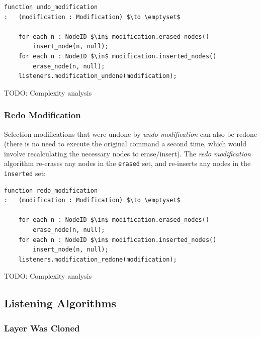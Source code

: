 \begin{lstlisting}[style=Default]
function undo_modification
:	(modification : Modification) $\to \emptyset$

	for each n : NodeID $\in$ modification.erased_nodes()
		insert_node(n, null);
	for each n : NodeID $\in$ modification.inserted_nodes()
		erase_node(n, null);
	listeners.modification_undone(modification);
\end{lstlisting}

\noindent TODO: Complexity analysis

\subsubsection{Redo Modification}

Selection modifications that were undone by \emph{undo modification} can also be redone (there is no need to execute the original command a second time, which would involve recalculating the necessary nodes to erase/insert). The \emph{redo modification} algorithm re-erases any nodes in the \texttt{erased} set, and re-inserts any nodes in the \texttt{inserted} set:

\begin{lstlisting}[style=Default]
function redo_modification
:	(modification : Modification) $\to \emptyset$

	for each n : NodeID $\in$ modification.erased_nodes()
		erase_node(n, null);
	for each n : NodeID $\in$ modification.inserted_nodes()
		insert_node(n, null);
	listeners.modification_redone(modification);
\end{lstlisting}

\noindent TODO: Complexity analysis

\newpage

\subsection{Listening Algorithms}

\subsubsection{Layer Was Cloned}

